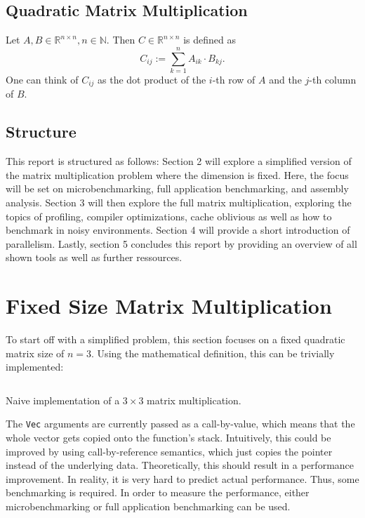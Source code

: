 \subsection{Quadratic Matrix Multiplication}

Let $A, B \in \mathbb{R}^{n\times n}, n \in \mathbb{N}$. Then $C \in \mathbb{R}^{n \times n}$ is defined as
\[
  C_{ij} := \sum_{k=1}^n A_{ik} \cdot B_{kj}.
\]
One can think of $C_{ij}$ as the dot product of the $i$-th row of $A$ and the $j$-th column of $B$.

\subsection{Structure}
This report is structured as follows: Section 2 will explore a simplified version of the matrix multiplication problem where the dimension is fixed. Here, the focus will be set on microbenchmarking, full application benchmarking, and assembly analysis. Section 3 will then explore the full matrix multiplication, exploring the topics of profiling, compiler optimizations, cache oblivious as well as how to benchmark in noisy environments. Section 4 will provide a short introduction of parallelism. Lastly, section 5 concludes this report by providing an overview of all shown tools as well as further ressources.

\section{Fixed Size Matrix Multiplication}
To start off with a simplified problem, this section focuses on a fixed quadratic matrix size of $n=3$. Using the mathematical definition, this can be trivially implemented:

\begin{listing}[H]
  \inputminted{rust}{./assets/first_impl.rs}
\caption{Naive implementation of a $3\times3$ matrix multiplication.}
\end{listing}

The \texttt{Vec} arguments are currently passed as a call-by-value, which means that the whole vector gets copied onto the function's stack. Intuitively, this could be improved by using call-by-reference semantics, which just copies the pointer instead of the underlying data. Theoretically, this should result in a performance improvement. In reality, it is very hard to predict actual performance. Thus, some benchmarking is required. In order to measure the performance, either microbenchmarking or full application benchmarking can be used.

